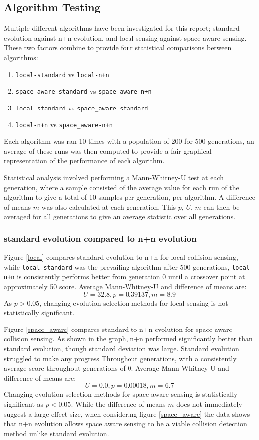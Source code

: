 \subsection{Algorithm Testing}
Multiple different algorithms have been investigated for this report; standard evolution against n+n evolution, and local sensing against space aware sensing. These two factors combine to provide four statistical comparisons between algorithms:
\begin{enumerate}
  \item \verb|local-standard| vs \verb|local-n+n|
  \item \verb|space_aware-standard| vs \verb|space_aware-n+n|
  \item \verb|local-standard| vs \verb|space_aware-standard|
  \item \verb|local-n+n| vs \verb|space_aware-n+n|
\end{enumerate}
Each algorithm was ran 10 times with a population of 200 for 500 generations, an average of these runs was then computed to provide a fair graphical representation of the performance of each algorithm.

Statistical analysis involved performing a Mann-Whitney-U test at each generation, where a sample consisted of the average value for each run of the algorithm to give a total of 10 samples per generation, per algorithm. A difference of means $m$ was also calculated at each generation. This $p$, $U$, $m$ can then be averaged for all generations to give an average statistic over all generations.

\subsubsection{standard evolution compared to n+n evolution}

Figure \ref{local} compares standard evolution to n+n for local collision sensing, while \verb|local-standard| was the prevailing algorithm after 500 generations, \verb|local-n+n| is consistently performs better from generation 0 until a crossover point at approximately 50 score. Average Mann-Whitney-U and difference of means are:
$$
U = 32.8, p = 0.39137, m = 8.9
$$
As $p > 0.05$, changing evolution selection methods for local sensing is not statistically significant.
\bigskip

Figure \ref{space_aware} compares standard to n+n evolution for space aware collision sensing. As shown in the graph, n+n performed significantly better than standard evolution, though standard deviation was large. Standard evolution struggled to make any progress Throughout generations, with a consistently average score throughout generations of 0. Average Mann-Whitney-U and difference of means are:
$$
U = 0.0, p = 0.00018, m = 6.7
$$
Changing evolution selection methods for space aware sensing is statistically significant as $p < 0.05$. While the difference of means $m$ does not immediately suggest a large effect size, when considering figure \ref{space_aware} the data shows that n+n evolution allows space aware sensing to be a viable collision detection method unlike standard evolution.

